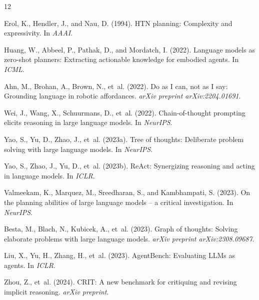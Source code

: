 \documentclass{article}
\begin{document}

\begin{thebibliography}{12}

Erol, K., Hendler, J., and Nau, D. (1994).
\newblock HTN planning: Complexity and expressivity.
\newblock In \emph{AAAI}.

Huang, W., Abbeel, P., Pathak, D., and Mordatch, I. (2022).
\newblock Language models as zero-shot planners: Extracting actionable knowledge for embodied agents.
\newblock In \emph{ICML}.

Ahn, M., Brohan, A., Brown, N., et~al. (2022).
\newblock Do as I can, not as I say: Grounding language in robotic affordances.
\newblock \emph{arXiv preprint arXiv:2204.01691}.

Wei, J., Wang, X., Schuurmans, D., et~al. (2022).
\newblock Chain-of-thought prompting elicits reasoning in large language models.
\newblock In \emph{NeurIPS}.

Yao, S., Yu, D., Zhao, J., et~al. (2023a).
\newblock Tree of thoughts: Deliberate problem solving with large language models.
\newblock In \emph{NeurIPS}.

Yao, S., Zhao, J., Yu, D., et~al. (2023b).
\newblock ReAct: Synergizing reasoning and acting in language models.
\newblock In \emph{ICLR}.

Valmeekam, K., Marquez, M., Sreedharan, S., and Kambhampati, S. (2023).
\newblock On the planning abilities of large language models -- a critical investigation.
\newblock In \emph{NeurIPS}.

Besta, M., Blach, N., Kubicek, A., et~al. (2023).
\newblock Graph of thoughts: Solving elaborate problems with large language models.
\newblock \emph{arXiv preprint arXiv:2308.09687}.

Liu, X., Yu, H., Zhang, H., et~al. (2023).
\newblock AgentBench: Evaluating LLMs as agents.
\newblock In \emph{ICLR}.

Zhou, Z., et~al. (2024).
\newblock CRIT: A new benchmark for critiquing and revising implicit reasoning.
\newblock \emph{arXiv preprint}.

\end{thebibliography}
\end{document}
